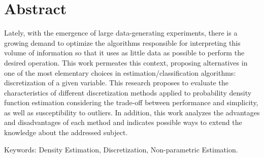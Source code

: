 %
%
\chapter*{Abstract}
\vspace{-1.5cm}

\noindent 

Lately, with the emergence of large data-generating experiments, there is a growing demand to optimize the algorithms responsible for interpreting this volume of information so that it uses as little data as possible to perform the desired operation. This work permeates this context, proposing alternatives in one of the most elementary choices in estimation/classification algorithms: discretization of a given variable. This research proposes to evaluate the characteristics of different discretization methods applied to probability density function estimation considering the trade-off between performance and simplicity, as well as susceptibility to outliers. In addition, this work analyzes the advantages and disadvantages of each method and indicates possible ways to extend the knowledge about the addressed subject.
\vspace{0.5cm}

\noindent Keywords: Density Estimation, Discretization, Non-parametric Estimation. \\

\newpage
